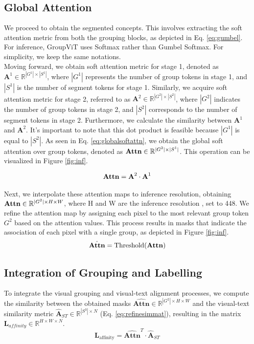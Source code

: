 \subsection{Global Attention}
We proceed to obtain the segmented concepts. This involves extracting the soft attention metric from both the grouping blocks, as depicted in Eq. \ref{eq:gumbel}. For inference, GroupViT uses Softmax rather than Gumbel Softmax.
For simplicity, we keep the same notations.\\

Moving forward, we obtain soft attention metric for stage 1, denoted as $\textbf{A}^1 \in \mathbb{R}^{|G^1| \times |S^1|}$, where $|G^1|$ represents the number of group tokens in stage 1, and $|S^1|$ is the number of segment tokens for stage 1. Similarly, we acquire soft attention metric for stage 2, referred to as $\textbf{A}^2 \in \mathbb{R}^{|G^2| \times |S^2|}$, where $|G^2|$ indicates the number of group tokens in stage 2, and $|S^2|$ corresponds to the number of segment tokens in stage 2. Furthermore, we calculate the similarity between $\textbf{A}^1$ and $\textbf{A}^2$. It's important to note that this dot product is feasible because $|G^1|$ is equal to $|S^2|$. As seen in Eq. \ref{eq:globalsoftattn}, we obtain the global soft attention over group tokens, denoted as $\text{\textbf{Attn}} \in \mathbb{R}^{|G^2| \times |S^1|}$. This operation can be visualized in Figure \ref{fig:inf}.

\begin{equation}
\label{eq:globalsoftattn}
       \text{\textbf{Attn}}  = \textbf{A}^2 \cdot \textbf{A}^1
\end{equation}

Next, we interpolate these attention maps to inference resolution, obtaining $\text{\textbf{Attn}} \in \mathbb{R}^{|G^2| \times H \times W}$, where H and W are the inference resolution , set to 448.   We refine the attention map by assigning each pixel to the most relevant group token $G^2$ based on the attention values. This process results in masks that indicate the association of each pixel with a single group, as depicted in Figure \ref{fig:inf}. 
\begin{equation}
\label{eq:thresholdattnmap}
    \hat{\text{\textbf{Attn}}} = \text{Threshold}(\text{\textbf{Attn}})
\end{equation}
\subsection{Integration of Grouping and Labelling}
To integrate the visual grouping and visual-text alignment processes, we compute the similarity between the obtained masks $\hat{\textbf{Attn}} \in \mathbb{R}^{|G^2| \times H \times W}$ and the visual-text similarity metric $\hat{\textbf{A}}_{ST} \in \mathbb{R}^{|S^3| \times N}$ (Eq. \ref{eq:refinesimmat}), resulting in the matrix $\textbf{L}_{affinity} \in \mathbb{R}^{ H \times W \times N }$. 
\begin{equation}
\label{eq:pred}
\mathbf{L}_{\text{affinity}} = \hat{\mathbf{Attn}}^T \cdot \hat{\mathbf{A}}_{ST}
\end{equation}


